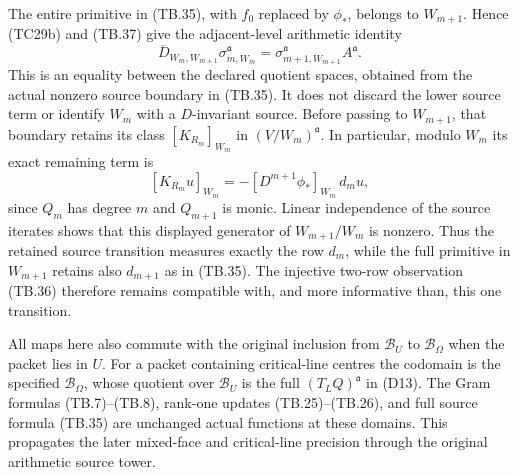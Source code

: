 The entire primitive in (TB.35), with $f_0$ replaced by $\phi_*$,
belongs to $W_{m+1}$.  Hence (TC29b) and (TB.37) give the
adjacent-level arithmetic identity
\[
\overline D_{W_m,W_{m+1}}\sigma_{m,W_m}^{\mathfrak a}
        =\sigma_{m+1,W_{m+1}}^{\mathfrak a} A^{\mathfrak a}.
\tag{TB.38}
\]
This is an equality between the declared quotient spaces, obtained
from the actual nonzero source boundary in (TB.35).  It does not
discard the lower source term or identify $W_m$ with a
$D$-invariant source.  Before passing to $W_{m+1}$, that boundary
retains its class $[K_{R_m}]_{W_m}$ in $(V/W_m)^{\mathfrak a}$.
In particular, modulo $W_m$ its exact remaining term is
\[
[K_{R_m}u]_{W_m}
       =-[D^{m+1}\phi_*]_{W_m}\,d_mu,
\tag{TB.39}
\]
since $Q_m$ has degree $m$ and $Q_{m+1}$ is monic.  Linear
independence of the source iterates shows that this displayed
generator of $W_{m+1}/W_m$ is nonzero.  Thus the retained source
transition measures exactly the row $d_m$, while the full
primitive in $W_{m+1}$ retains also $d_{m+1}$ as in (TB.35).
The injective two-row observation (TB.36) therefore remains
compatible with, and more informative than, this one transition.

All maps here also commute with the original inclusion from
$\mathscr B_U$ to $\mathscr B_\Omega$ when the packet lies in $U$.
For a packet containing critical-line centres the codomain is
the specified $\mathscr B_\Omega$, whose quotient over
$\mathscr B_U$ is the full $(T_LQ)^{\mathfrak a}$ in (D13).  The Gram formulas
(TB.7)--(TB.8), rank-one updates (TB.25)--(TB.26), and full
source formula (TB.35) are unchanged actual functions at these
domains.  This propagates the later mixed-face and critical-line
precision through the original arithmetic source tower.
